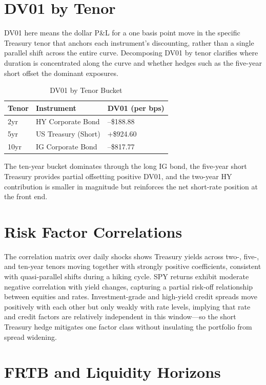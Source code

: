 \documentclass[11pt, a4paper]{article}
\begin{document}
\section{DV01 by Tenor}

DV01 here means the dollar P\&L for a one basis point move in the specific Treasury tenor that anchors each instrument's discounting, rather than a single parallel shift across the entire curve. Decomposing DV01 by tenor clarifies where duration is concentrated along the curve and whether hedges such as the five-year short offset the dominant exposures.

\begin{table}[H]
\centering
\caption{DV01 by Tenor Bucket}
\begin{tabularx}{\textwidth}{lXX}
\toprule
\textbf{Tenor} & \textbf{Instrument} & 
\textbf{DV01 (per bps)} \\
\midrule
2yr & HY Corporate Bond & --\$188.88 \\
5yr & US Treasury (Short) & +\$924.60 \\
10yr & IG Corporate Bond & --\$817.77 \\
\bottomrule
\end{tabularx}
\end{table}

The ten-year bucket dominates through the long IG bond, the five-year short Treasury provides partial offsetting positive DV01, and the two-year HY contribution is smaller in magnitude but reinforces the net short-rate position at the front end.

\section{Risk Factor Correlations}

The correlation matrix over daily shocks shows Treasury yields across two-, five-, and ten-year tenors moving together with strongly positive coefficients, consistent with quasi-parallel shifts during a hiking cycle. SPY returns exhibit moderate negative correlation with yield changes, capturing a partial risk-off relationship between equities and rates. Investment-grade and high-yield credit spreads move positively with each other but only weakly with rate levels, implying that rate and credit factors are relatively independent in this window---so the short Treasury hedge mitigates one factor class without insulating the portfolio from spread widening.

\section{FRTB and Liquidity Horizons}
\end{document}
